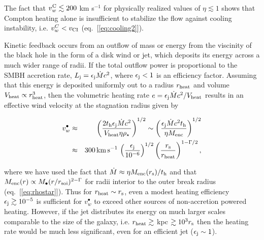 \documentclass[usenatbib,fleqn]{mn2e}
\begin{document}
The fact that $v_{w}^{\rm C} \lesssim 200$ km s$^{-1}$ for physically
realized values of $\eta \lesssim 1$ shows that Compton heating alone
is insufficient to stabilize the flow against cooling instability,
i.e. $v_{w}^{C} < v_{\rm CI}$ (eq.~[\ref{eq:cooling2}]).

Kinetic feedback occurs from an outflow of mass or energy from the
viscinity of the black hole in the form of a disk wind or jet, which
deposits its energy across a much wider range of radii.  If the total
outflow power is proportional to the SMBH accretion rate, $L_{\rm j} =
\epsilon_{\rm j} \dot{M}c^{2}$, where $\epsilon_{\rm j} < 1$ is an
efficiency factor.  Assuming that this energy is deposited uniformly
out to a radius $r_{\rm heat}$ and volume $V_{\rm heat} \propto r_{\rm
heat}^{3}$, then the volumetric heating rate $e = \epsilon_{\rm
j}\dot{M}c^{2}/V_{\rm heat}$ results in an effective wind velocity at
the stagnation radius given by

\begin{eqnarray} v_{w}^{\bullet} &\approx& \left(\frac{2t_{\rm
h}\epsilon_{\rm j}\dot{M}c^{2}}{V_{\rm heat}\eta
\rho_{\star}}\right)^{1/2} \sim \left(\frac{\epsilon_{\rm
j}\dot{M}c^{2}t_{\rm h}}{\eta M_{\rm enc}}\right)^{1/2} \nonumber \\
&\approx& 300\,{\rm km\,s^{-1}}\,\left(\frac{\epsilon_{\rm j}}{10^{-6}}\right)^{1/2}\left(\frac{r_{\rm s}}{r_{\rm
heat}}\right)^{1-\Gamma/2},
\label{eq:vjet}
\end{eqnarray} 

where we have used the fact that $\dot{M} \approx \eta M_{\rm
enc}(r_{\rm s})/t_{\rm h}$ and that $M_{\rm enc}(r) \propto
M_{\bullet}(r/r_{\rm soi})^{2-\Gamma}$ for radii interior to the outer
break radius (eq.~[\ref{eq:rhostar}]).  Thus for $r_{\rm heat} \sim
r_{\rm s}$, even a modest heating efficiency $\epsilon_{\rm j} \gtrsim
10^{-5}$ is sufficient for $v_{w}^{\bullet}$ to exceed other sources
of non-accretion powered heating.  However, if the jet distributes its
energy on much larger scales comparable to the size of the galaxy,
i.e. $r_{\rm heat} \gtrsim $ kpc $\gtrsim 10^{3}r_{\rm s}$ then the
heating rate would be much less significant, even for an efficient jet
($\epsilon_{\rm j} \sim 1$).
\end{document}
